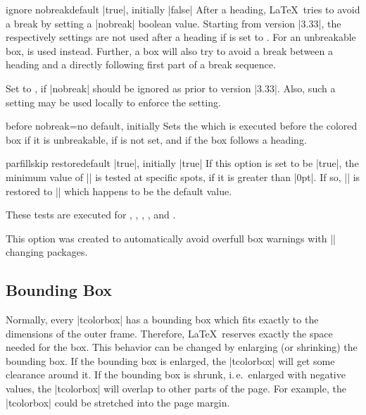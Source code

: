 \begin{docTcbKey}[][doc new=2014-12-11]{ignore nobreak}{}{default |true|, initially |false|}
After a heading, \LaTeX\ tries to avoid a break by setting a |nobreak| boolean value.
Starting from version |3.33|, the  respectively 
settings are not used after a heading if  is
set to . For an unbreakable box,  is used instead.
Further, a  box will also try to
avoid a break between a heading and a directly following first part of a
break sequence.

Set  to , if |nobreak| should be
ignored as prior to version |3.33|. Also, such a setting may be used locally to
enforce the  setting.
\end{docTcbKey}

\begin{docTcbKey}[][doc new=2014-12-16]{before nobreak}{=}{no default, initially }
  Sets the  which is executed before the colored box if it
  is unbreakable, if  is not set, and if
  the box follows a heading.
\end{docTcbKey}


\begin{docTcbKey}[][doc new=2017-02-23]{parfillskip restore}{}{default |true|, initially |true|}
  If this option is set to be |true|, the minimum value of |\parfillskip| is
  tested at specific spots, if it is greater than |0pt|.
  If so, |\parfillskip| is restored to |\@flushglue| which happens to be
  the default value.

  These tests are executed for
  ,
  ,
  ,
  , and
  .

  This option was created to automatically
  avoid overfull box warnings with |\parfillskip| changing packages.
\end{docTcbKey}



\clearpage
\subsection{Bounding Box}
Normally, every |tcolorbox| has a bounding box which fits exactly to the
dimensions of the outer frame. Therefore, \LaTeX\ reserves exactly the space
needed for the box.
This behavior can be changed by enlarging (or shrinking) the bounding box.
If the bounding box is enlarged, the |tcolorbox| will get some clearance
around it. If the bounding box is shrunk, i.\,e.\ enlarged with negative
values, the |tcolorbox| will overlap to other parts of the page.
For example, the |tcolorbox| could be stretched into the page margin.

